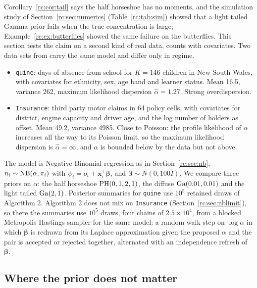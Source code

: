 Corollary~\ref{rc:cor:tail} says the half horseshoe has no moments, and the simulation study of Section~\ref{rc:sec:numerics} (Table~\ref{rc:tab:sim}) showed that a light tailed Gamma prior fails when the true concentration is large; Example~\ref{rc:ex:butterflies} showed the same failure on the butterflies. This section tests the claim on a second kind of real data, counts with covariates. Two data sets from \citet{rc:venables2002} carry the same model and differ only in regime.
\begin{itemize}
\item \texttt{quine}: days of absence from school for $K=146$ children in New South Wales, with covariates for ethnicity, sex, age band and learner status. Mean 16.5, variance 262, maximum likelihood dispersion $\hat\alpha=1.27$. Strong overdispersion.
\item \texttt{Insurance}: third party motor claims in 64 policy cells, with covariates for district, engine capacity and driver age, and the log number of holders as offset. Mean 49.2, variance 4985. Close to Poisson: the profile likelihood of $\alpha$ increases all the way to its Poisson limit, so the maximum likelihood dispersion is $\hat\alpha=\infty$, and $\alpha$ is bounded below by the data but not above.
\end{itemize}

The model is Negative Binomial regression as in Section~\ref{rc:sec:nb}, $n_i\sim\mathrm{NB}(\alpha,\pi_i)$ with $\psi_i=o_i+\bm x_i^\top\bm\beta$, and $\bm\beta\sim N(0,100I)$. We compare three priors on $\alpha$: the half horseshoe $\mathrm{PH}(0,1,2,1)$, the diffuse $\mathrm{Ga}(0.01,0.01)$ and the light tailed $\mathrm{Ga}(2,1)$. Posterior summaries for \texttt{quine} use $10^5$ retained draws of Algorithm 2. Algorithm 2 does not mix on \texttt{Insurance} (Section~\ref{rc:sec:nblimit}), so there the summaries use $10^5$ draws, four chains of $2.5\times10^4$, from a blocked Metropolis Hastings sampler for the same model: a random walk step on $\log\alpha$ in which $\bm\beta$ is redrawn from its Laplace approximation given the proposed $\alpha$ and the pair is accepted or rejected together, alternated with an independence refresh of $\bm\beta$.

\subsection{Where the prior does not matter}

